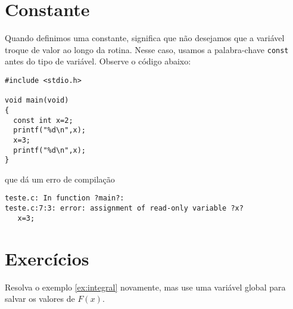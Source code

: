 \section{Constante}
Quando definimos uma constante, significa que não desejamos que a variável troque de valor ao longo da rotina. Nesse caso, usamos a palabra-chave \verb|const| antes do tipo de variável. Observe o código abaixo:
\begin{verbatim}
#include <stdio.h>

void main(void)
{
  const int x=2;
  printf("%d\n",x);
  x=3;
  printf("%d\n",x);
}
\end{verbatim}
que dá um erro de compilação
\begin{verbatim}
teste.c: In function ?main?:
teste.c:7:3: error: assignment of read-only variable ?x?
   x=3;
\end{verbatim}



\section{Exercícios}
\begin{exer}
Resolva o exemplo \ref{ex:integral} novamente, mas use uma variável global para salvar os valores de $F(x)$.
\end{exer}




